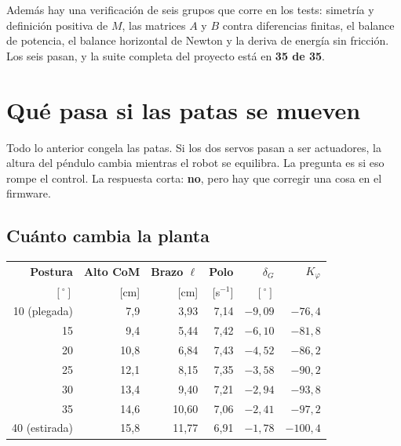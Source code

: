 \documentclass[11pt,a4paper]{report}
\begin{document}
Además hay una verificación de seis grupos que corre en los tests: simetría y definición
positiva de $M$, las matrices $A$ y $B$ contra diferencias finitas, el balance de potencia,
el balance horizontal de Newton y la deriva de energía sin fricción. Los seis pasan, y la
suite completa del proyecto está en \textbf{35 de 35}.

\chapter{Qué pasa si las patas se mueven}\label{cap:patasmov}

\begin{idea}
Todo lo anterior congela las patas. Si los dos servos pasan a ser actuadores, la altura del
péndulo cambia mientras el robot se equilibra. La pregunta es si eso rompe el control.
La respuesta corta: \textbf{no}, pero hay que corregir una cosa en el firmware.
\end{idea}

\section{Cuánto cambia la planta}

\begin{center}
\begin{tabular}{@{}rrrrrr@{}}
\toprule
\textbf{Postura} & \textbf{Alto CoM} & \textbf{Brazo $\ell$} & \textbf{Polo} &
\textbf{$\delta_G$} & \textbf{$K_\varphi$} \\
$[^\circ]$ & [cm] & [cm] & [s$^{-1}$] & $[^\circ]$ & \\
\midrule
10 (plegada) & 7{,}9 & 3{,}93 & 7{,}14 & $-9{,}09$ & $-76{,}4$ \\
15 & 9{,}4 & 5{,}44 & 7{,}42 & $-6{,}10$ & $-81{,}8$ \\
20 & 10{,}8 & 6{,}84 & 7{,}43 & $-4{,}52$ & $-86{,}2$ \\
25 & 12{,}1 & 8{,}15 & 7{,}35 & $-3{,}58$ & $-90{,}2$ \\
30 & 13{,}4 & 9{,}40 & 7{,}21 & $-2{,}94$ & $-93{,}8$ \\
35 & 14{,}6 & 10{,}60 & 7{,}06 & $-2{,}41$ & $-97{,}2$ \\
40 (estirada) & 15{,}8 & 11{,}77 & 6{,}91 & $-1{,}78$ & $-100{,}4$ \\
\bottomrule
\end{tabular}
\end{center}
\end{document}
